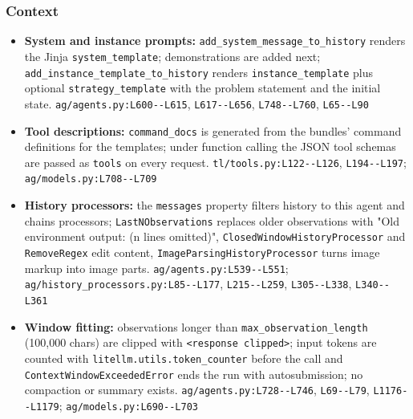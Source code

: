 \subsubsection*{Context}
\begin{itemize}
\item \textbf{System and instance prompts:} \texttt{add\_\allowbreak{}system\_\allowbreak{}message\_\allowbreak{}to\_\allowbreak{}history} renders the Jinja \texttt{system\_\allowbreak{}template}; demonstrations are added next; \texttt{add\_\allowbreak{}instance\_\allowbreak{}template\_\allowbreak{}to\_\allowbreak{}history} renders \texttt{instance\_\allowbreak{}template} plus optional \texttt{strategy\_\allowbreak{}template} with the problem statement and the initial state. \texttt{ag/\allowbreak{}agents.\allowbreak{}py:\allowbreak{}L600-\allowbreak{}-\allowbreak{}L615}, \texttt{L617-\allowbreak{}-\allowbreak{}L656}, \texttt{L748-\allowbreak{}-\allowbreak{}L760}, \texttt{L65-\allowbreak{}-\allowbreak{}L90}
\item \textbf{Tool descriptions:} \texttt{command\_\allowbreak{}docs} is generated from the bundles' command definitions for the templates; under function calling the JSON tool schemas are passed as \texttt{tools} on every request. \texttt{tl/\allowbreak{}tools.\allowbreak{}py:\allowbreak{}L122-\allowbreak{}-\allowbreak{}L126}, \texttt{L194-\allowbreak{}-\allowbreak{}L197}; \texttt{ag/\allowbreak{}models.\allowbreak{}py:\allowbreak{}L708-\allowbreak{}-\allowbreak{}L709}
\item \textbf{History processors:} the \texttt{messages} property filters history to this agent and chains processors; \texttt{LastNObservations} replaces older observations with "Old environment output: (n lines omitted)", \texttt{ClosedWindowHistoryProcessor} and \texttt{RemoveRegex} edit content, \texttt{ImageParsingHistoryProcessor} turns image markup into image parts. \texttt{ag/\allowbreak{}agents.\allowbreak{}py:\allowbreak{}L539-\allowbreak{}-\allowbreak{}L551}; \texttt{ag/\allowbreak{}history\_\allowbreak{}processors.\allowbreak{}py:\allowbreak{}L85-\allowbreak{}-\allowbreak{}L177}, \texttt{L215-\allowbreak{}-\allowbreak{}L259}, \texttt{L305-\allowbreak{}-\allowbreak{}L338}, \texttt{L340-\allowbreak{}-\allowbreak{}L361}
\item \textbf{Window fitting:} observations longer than \texttt{max\_\allowbreak{}observation\_\allowbreak{}length} (100,000 chars) are clipped with \texttt{<response clipped>}; input tokens are counted with \texttt{litellm.\allowbreak{}utils.\allowbreak{}token\_\allowbreak{}counter} before the call and \texttt{ContextWindowExceededError} ends the run with autosubmission; no compaction or summary exists. \texttt{ag/\allowbreak{}agents.\allowbreak{}py:\allowbreak{}L728-\allowbreak{}-\allowbreak{}L746}, \texttt{L69-\allowbreak{}-\allowbreak{}L79}, \texttt{L1176-\allowbreak{}-\allowbreak{}L1179}; \texttt{ag/\allowbreak{}models.\allowbreak{}py:\allowbreak{}L690-\allowbreak{}-\allowbreak{}L703}

\end{itemize}
